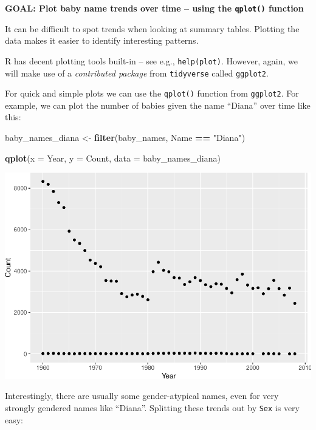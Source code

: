 \documentclass[]{book}
\newenvironment{Shaded}{\begin{snugshade}}{\end{snugshade}}
\newcommand{\KeywordTok}[1]{\textcolor[rgb]{0.13,0.29,0.53}{\textbf{#1}}}
\newcommand{\DataTypeTok}[1]{\textcolor[rgb]{0.13,0.29,0.53}{#1}}
\newcommand{\StringTok}[1]{\textcolor[rgb]{0.31,0.60,0.02}{#1}}
\newcommand{\OperatorTok}[1]{\textcolor[rgb]{0.81,0.36,0.00}{\textbf{#1}}}
\newcommand{\NormalTok}[1]{#1}
\begin{document}
\textbf{GOAL: Plot baby name trends over time -- using the
\texttt{qplot()} function}

It can be difficult to spot trends when looking at summary tables.
Plotting the data makes it easier to identify interesting patterns.

R has decent plotting tools built-in -- see e.g., \texttt{help(plot)}.
However, again, we will make use of a \emph{contributed package} from
\texttt{tidyverse} called \texttt{ggplot2}.

For quick and simple plots we can use the \texttt{qplot()} function from
\texttt{ggplot2}. For example, we can plot the number of babies given
the name ``Diana'' over time like this:

\begin{Shaded}
\begin{Highlighting}[]
\NormalTok{baby_names_diana <-}\StringTok{ }\KeywordTok{filter}\NormalTok{(baby_names, Name }\OperatorTok{==}\StringTok{ "Diana"}\NormalTok{)}
\end{Highlighting}
\end{Shaded}

\begin{Shaded}
\begin{Highlighting}[]
\KeywordTok{qplot}\NormalTok{(}\DataTypeTok{x =}\NormalTok{ Year, }\DataTypeTok{y =}\NormalTok{ Count,}
     \DataTypeTok{data =}\NormalTok{ baby_names_diana)}
\end{Highlighting}
\end{Shaded}

\includegraphics{R/Rintro/figures/unnamed-chunk-33-1.pdf}

Interestingly, there are usually some gender-atypical names, even for
very strongly gendered names like ``Diana''. Splitting these trends out
by \texttt{Sex} is very easy:
\end{document}
